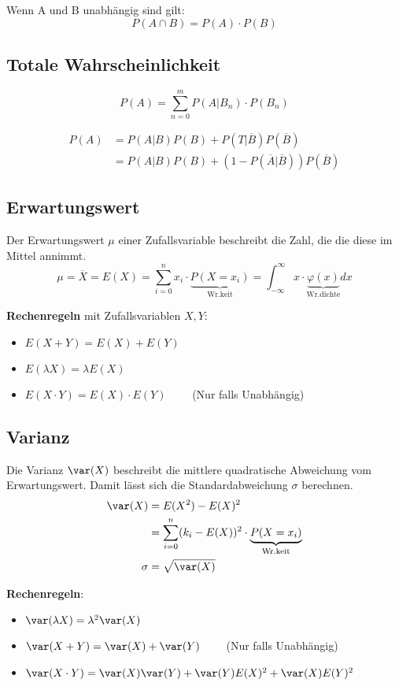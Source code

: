 \noindent Wenn A und B unabhängig sind gilt:
\[ P(A \cap B) = P(A) \cdot P(B)\]


\subsection{Totale Wahrscheinlichkeit}
\[
P(A) = \sum_{n=0}^{m}P(A|B_n)\cdot P(B_n)
\]

\begin{align*}
	P(A) &=P(A|B)P(B) + P(T|\overline{B})P(\overline{B}) \\
	&= P(A|B)P(B) + (1 - P(\overline{A}|\overline{B}))P(\overline{B})
\end{align*}


\subsection{Erwartungswert}
Der Erwartungswert $\mu$ einer Zufallsvariable beschreibt die Zahl, die die diese im Mittel annimmt.
\[
\mu = \overline{X} = E(X)= \sum\limits_{i=0}^{n}x_i\cdot \underbrace{P(X=x_i)}_\text{Wr.keit} = \int_{-\infty}^{\infty}x\cdot \underbrace{\varphi(x)}_{\text{Wr.dichte}}dx
\]

\textbf{Rechenregeln} mit Zufallsvariablen $X, Y$:
\begin{itemize}[nosep]
	\item $E(X + Y) = E(X) + E(Y)$
	\item $E(\lambda X) = \lambda E(X)$ 
	\item $E(X\cdot Y) = E(X) \cdot E(Y) \qquad$  (Nur falls Unabhängig)
\end{itemize}

\subsection{Varianz}
Die Varianz $\var(X)$ beschreibt die mittlere quadratische Abweichung vom Erwartungswert. Damit lässt sich die Standardabweichung $\sigma$ berechnen.
\begin{align*}
	\var(X) &= E(X^2) - E(X)^2 \\
	&=\sum\limits_{i=0}^{n}(k_i - E(X))^2 \cdot \underbrace{P(X=x_i)}_\text{Wr.keit} \\
	\sigma &= \sqrt{\var(X)}	
\end{align*}

\noindent\textbf{Rechenregeln}:
\begin{itemize}[nosep]
	\item $\var(\lambda X) = \lambda^2\var(X)$
	\item $\var(X + Y) = \var(X) + \var(Y) \qquad$ (Nur falls Unabhängig)
	\item $\var(X\cdot Y) = \var(X)\var(Y) + \var(Y)E(X)^2 + \var(X)E(Y)^2$
\end{itemize}


